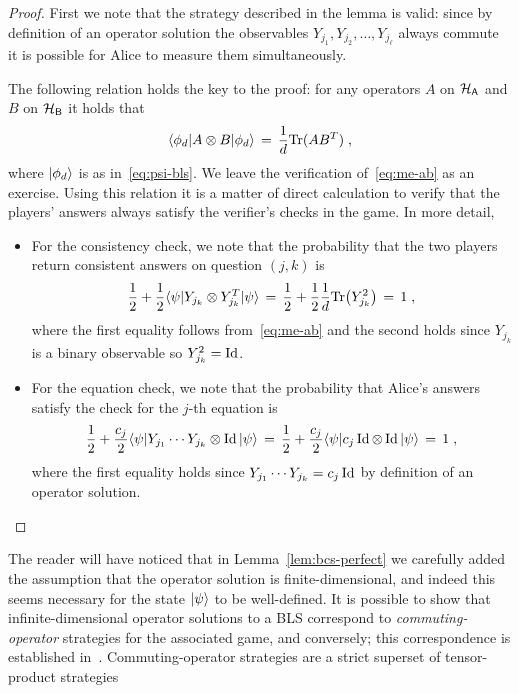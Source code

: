 \begin{proof}
First we note that the strategy described in the lemma is valid: since by definition of an operator solution the observables $Y_{j_1},Y_{j_2},\ldots,Y_{j_\ell}$ always commute it is possible for Alice to measure them simultaneously. 

The following relation holds the key to the proof: for any operators $A$ on $\mathcal{H}_{\textsf{A}}$ and $B$ on $\mathcal{H}_{\textsf{B}}$ it holds that 
\begin{equation}\label{eq:me-ab}
\langle\phi_d| A\otimes B |\phi_d\rangle \,=\, \frac{1}{d}\mbox{\rm Tr}(AB^T)\;,
\end{equation}
where $|\phi_d\rangle$ is as in~\eqref{eq:psi-bls}. We leave the verification of~\eqref{eq:me-ab} as an exercise. Using this relation it is a matter of direct calculation to verify that the players' answers always satisfy the verifier's checks in the game. In more detail, 
\begin{itemize}
\item For the consistency check, we note that the probability that the two players return consistent answers on question $(j,k)$ is 
\[ \frac{1}{2}+\frac{1}{2}\langle\psi| Y_{j_k} \otimes Y_{j_k}^T |\psi\rangle \,=\, \frac{1}{2}+\frac{1}{2}\frac{1}{d} \mbox{\rm Tr}\big(Y_{j_k}^2\big) \,=\, 1\;,\]
where the first equality follows from~\eqref{eq:me-ab} and the second holds since $Y_{j_k}$ is a binary observable so $Y_{j_k}^2 = \mathop{\rm Id}\nolimits$. 
\item For the equation check, we note that the probability that Alice's answers satisfy the check for the $j$-th equation is 
\[ \frac{1}{2}+\frac{c_j}{2}\langle\psi|  Y_{j_1}\cdots Y_{j_k}\otimes \mathop{\rm Id}\nolimits |\psi\rangle \,=\,\frac{1}{2}+\frac{c_j}{2} \langle\psi| c_j\mathop{\rm Id}\nolimits\otimes \mathop{\rm Id}\nolimits  |\psi\rangle\,=\,1\;,\]
where the first equality holds since $Y_{j_1}\cdots Y_{j_k} =c_j\mathop{\rm Id}\nolimits$ by definition of an operator solution.
\end{itemize}
\end{proof}

\begin{remark}
The reader will have noticed that in Lemma~\ref{lem:bcs-perfect} we carefully added the assumption that the operator solution is finite-dimensional, and indeed this seems necessary for the state $|\psi\rangle$ to be well-defined. It is possible to show that infinite-dimensional operator solutions to a BLS correspond to \emph{commuting-operator} strategies for the associated game, and conversely; this correspondence is established in~\cite{cleve2017perfect}. Commuting-operator strategies are a strict superset of tensor-product strategies  
\end{remark}

